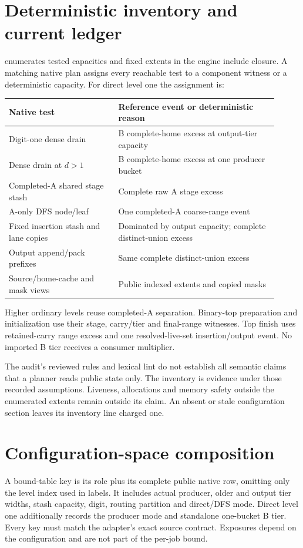 \documentclass[11pt]{article}
\theoremstyle{definition}
\theoremstyle{remark}
\begin{document}
\section{Deterministic inventory and current ledger}
\label{sec:deterministic-inventory}\label{prop:deterministic-inventory}
 enumerates tested capacities and
fixed extents in the engine include closure. A matching native plan assigns
every reachable test to a component witness or a deterministic capacity.
For direct level one the assignment is:
\begin{center}\small
\begin{tabular}{p{0.37\linewidth}p{0.54\linewidth}}
\toprule
Native test & Reference event or deterministic reason\\\midrule
Digit-one dense drain & B complete-home excess at output-tier capacity\\
Dense drain at $d>1$ & B complete-home excess at one producer bucket\\
Completed-A shared stage stash & Complete raw A stage excess\\
A-only DFS node/leaf & One completed-A coarse-range event\\
Fixed insertion stash and lane copies & Dominated by output capacity;
complete distinct-union excess\\
Output append/pack prefixes & Same complete distinct-union excess\\
Source/home-cache and mask views & Public indexed extents and copied masks\\
\bottomrule
\end{tabular}
\end{center}
Higher ordinary levels reuse completed-A separation. Binary-top preparation
and initialization use their stage, carry/tier and final-range witnesses.
Top finish uses retained-carry range excess and one resolved-live-set
insertion/output event. No imported B tier receives a consumer multiplier.

The audit's reviewed rules and lexical lint do not establish all semantic
claims that a planner reads public state only. The inventory is evidence
under those recorded assumptions. Liveness, allocations and memory safety
outside the enumerated extents remain outside its claim. An absent or stale
configuration section leaves its inventory line charged one.

\section{Configuration-space composition}
\label{sec:configuration-space}\label{prop:shape-key}
A bound-table key is its role plus its complete public native row, omitting
only the level index used in labels. It includes actual producer, older and
output tier widths, stash capacity, digit, routing partition and direct/DFS
mode. Direct level one additionally records the producer mode and standalone
one-bucket B tier. Every key must match the adapter's exact source contract.
Exposures depend on the configuration and are not part of the per-job bound.
\end{document}

